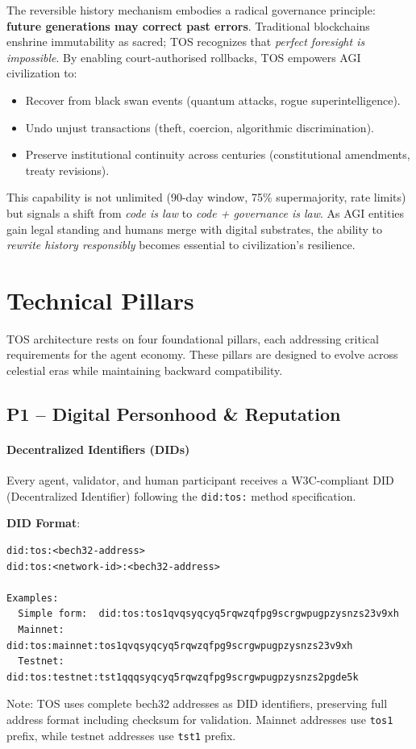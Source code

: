 \documentclass[11pt]{article}
\begin{document}
The reversible history mechanism embodies a radical governance principle: \textbf{future generations may correct past errors}. Traditional blockchains enshrine immutability as sacred; TOS recognizes that \emph{perfect foresight is impossible}. By enabling court-authorised rollbacks, TOS empowers AGI civilization to:
\begin{itemize}[noitemsep]
  \item Recover from black swan events (quantum attacks, rogue superintelligence).
  \item Undo unjust transactions (theft, coercion, algorithmic discrimination).
  \item Preserve institutional continuity across centuries (constitutional amendments, treaty revisions).
\end{itemize}

This capability is not unlimited (90-day window, 75\% supermajority, rate limits) but signals a shift from \emph{code is law} to \emph{code + governance is law}. As AGI entities gain legal standing and humans merge with digital substrates, the ability to \emph{rewrite history responsibly} becomes essential to civilization's resilience.

\section{Technical Pillars}

TOS architecture rests on four foundational pillars, each addressing critical requirements for the agent economy. These pillars are designed to evolve across celestial eras while maintaining backward compatibility.

\subsection{P1 -- Digital Personhood \& Reputation}
\label{sec:pillar-identity}

\paragraph{Decentralized Identifiers (DIDs)}
Every agent, validator, and human participant receives a W3C-compliant DID (Decentralized Identifier) following the \texttt{did:tos:} method specification.

\textbf{DID Format}:
\begin{verbatim}
did:tos:<bech32-address>
did:tos:<network-id>:<bech32-address>

Examples:
  Simple form:  did:tos:tos1qvqsyqcyq5rqwzqfpg9scrgwpugpzysnzs23v9xh
  Mainnet:      did:tos:mainnet:tos1qvqsyqcyq5rqwzqfpg9scrgwpugpzysnzs23v9xh
  Testnet:      did:tos:testnet:tst1qqqsyqcyq5rqwzqfpg9scrgwpugpzysnzs2pgde5k
\end{verbatim}
Note: TOS uses complete bech32 addresses as DID identifiers, preserving full address format including checksum for validation. Mainnet addresses use \texttt{tos1} prefix, while testnet addresses use \texttt{tst1} prefix.
\end{document}
